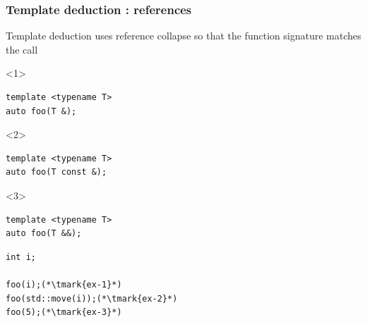 \documentclass[14pt]{beamer}
\begin{document}
\begin{frame}[fragile]
  \frametitle{Template deduction : references}

  Template deduction uses reference collapse so that the function signature
  matches the call

  \begin{overlayarea}{\textwidth}{5cm}
    \begin{onlyenv}<1>
      \begin{lstlisting}[basicstyle=\codefontsize{12pt}]
template <typename T>
auto foo(T &);
      \end{lstlisting}
    \end{onlyenv}

    \begin{onlyenv}<2>
      \begin{lstlisting}[basicstyle=\codefontsize{12pt}]
template <typename T>
auto foo(T const &);
      \end{lstlisting}
    \end{onlyenv}

    \begin{onlyenv}<3>
      \begin{lstlisting}[basicstyle=\codefontsize{12pt}]
template <typename T>
auto foo(T &&);
      \end{lstlisting}
    \end{onlyenv}


    \begin{lstlisting}[basicstyle=\codefontsize{12pt}]
int i;

foo(i);(*\tmark{ex-1}*)
foo(std::move(i));(*\tmark{ex-2}*)
foo(5);(*\tmark{ex-3}*)
    \end{lstlisting}
  \end{overlayarea}


\end{frame}
\end{document}
